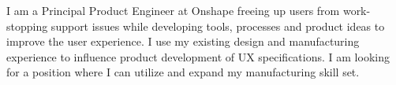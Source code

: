 

\begin{cvparagraph}

I am a Principal Product Engineer at Onshape freeing up users from work-stopping support issues while developing tools, processes and product ideas to improve the user experience. I use my existing design and manufacturing experience to influence product development of UX specifications. I am looking for a position where I can utilize and expand my manufacturing skill set.
\end{cvparagraph}
